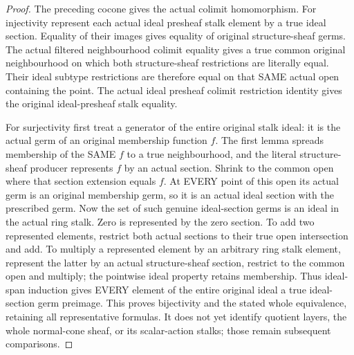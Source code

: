 \begin{proof}
The preceding cocone gives the actual colimit homomorphism. For injectivity
represent each actual ideal presheaf stalk element by a true ideal section.
Equality of their images gives equality of original structure-sheaf germs.
The actual filtered neighbourhood colimit equality gives a true common
original neighbourhood on which both structure-sheaf restrictions are
literally equal. Their ideal subtype restrictions are therefore equal on
that SAME actual open containing the point. The actual ideal presheaf
colimit restriction identity gives the original ideal-presheaf stalk equality.

For surjectivity first treat a generator of the entire original stalk
ideal: it is the actual germ of an original membership function $f$.
The first lemma spreads membership of the SAME $f$ to a true neighbourhood,
and the literal structure-sheaf producer represents $f$ by an actual section.
Shrink to the common open where that section extension equals $f$. At
EVERY point of this open its actual germ is an original membership germ,
so it is an actual ideal section with the prescribed germ. Now the set
of such genuine ideal-section germs is an ideal in the actual ring stalk.
Zero is represented by the zero section. To add two represented elements,
restrict both actual sections to their true open intersection and add.
To multiply a represented element by an arbitrary ring stalk element,
represent the latter by an actual structure-sheaf section, restrict to
the common open and multiply; the pointwise ideal property retains
membership. Thus ideal-span induction gives EVERY element of the entire
original ideal a true ideal-section germ preimage. This proves bijectivity
and the stated whole equivalence, retaining all representative formulas.
It does not yet identify quotient layers, the whole normal-cone sheaf,
or its scalar-action stalks; those remain subsequent comparisons.
\end{proof}


